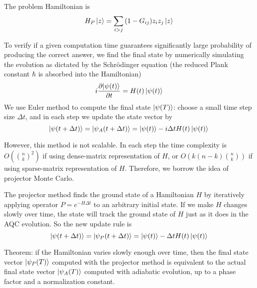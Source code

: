 \documentclass[12pt]{article}
\begin{document}
The problem Hamiltonian is 
\begin{equation}
	H_P \ket{z} = \sum_{i>j}{(1-G_{ij}) z_i z_j \ket{z}}
\end{equation}

To verify if a given computation time guarantees significantly large probability of producing the correct answer, we find the final state by numerically simulating the evolution as dictated by the Schr\"odinger equation (the reduced Plank constant $\hbar$ is absorbed into the Hamiltonian)
\begin{equation}
	i \frac{\partial{\ket{\psi(t)}}}{\partial{t}} = H(t) \ket{\psi(t)}
\end{equation}
We use Euler method to compute the final state $\ket{\psi(T)}$: choose a small time step size $\Delta{t}$, and in each step we update the state vector by 
\begin{equation}
	\ket{\psi(t + \Delta{t})} = \ket{\psi_A(t + \Delta{t})} = \ket{\psi(t)} - i \Delta{t} H(t) \ket{\psi(t)}
\end{equation}

However, this method is not scalable. In each step the time complexity is $O(\binom{n}{k}^2)$ if using dense-matrix representation of $H$, or $O(k(n-k) \binom{n}{k})$ if using sparse-matrix representation of $H$. Therefore, we borrow the idea of projector Monte Carlo. 

The projector method finds the ground state of a Hamiltonian $H$ by iteratively applying operator $P = e^{-H \Delta{t}}$ to an arbitrary initial state. If we make $H$ changes slowly over time, the state will track the ground state of $H$ just as it does in the AQC evolution. So the new update rule is
\begin{equation}
	\ket{\psi(t + \Delta{t})} = \ket{\psi_P(t + \Delta{t})} = \ket{\psi(t)} - \Delta{t} H(t) \ket{\psi(t)}
\end{equation}

Theorem: if the Hamiltonian varies slowly enough over time, then the final state vector $\ket{\psi_P(T)}$ computed with the projector method is equivalent to the actual final state vector $\ket{\psi_A(T)}$ computed with adiabatic evolution, up to a phase factor and a normalization constant. 
\end{document}
